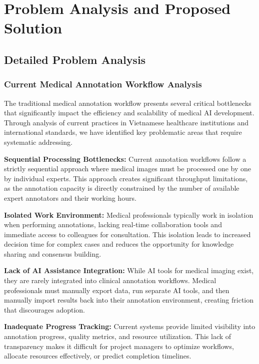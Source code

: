\chapter{Problem Analysis and Proposed Solution}

\section{Detailed Problem Analysis}

\subsection{Current Medical Annotation Workflow Analysis}

The traditional medical annotation workflow presents several critical bottlenecks that significantly impact the efficiency and scalability of medical AI development. Through analysis of current practices in Vietnamese healthcare institutions and international standards, we have identified key problematic areas that require systematic addressing.

\textbf{Sequential Processing Bottlenecks:} Current annotation workflows follow a strictly sequential approach where medical images must be processed one by one by individual experts. This approach creates significant throughput limitations, as the annotation capacity is directly constrained by the number of available expert annotators and their working hours.

\textbf{Isolated Work Environment:} Medical professionals typically work in isolation when performing annotations, lacking real-time collaboration tools and immediate access to colleagues for consultation. This isolation leads to increased decision time for complex cases and reduces the opportunity for knowledge sharing and consensus building.

\textbf{Lack of AI Assistance Integration:} While AI tools for medical imaging exist, they are rarely integrated into clinical annotation workflows. Medical professionals must manually export data, run separate AI tools, and then manually import results back into their annotation environment, creating friction that discourages adoption.

\textbf{Inadequate Progress Tracking:} Current systems provide limited visibility into annotation progress, quality metrics, and resource utilization. This lack of transparency makes it difficult for project managers to optimize workflows, allocate resources effectively, or predict completion timelines.

